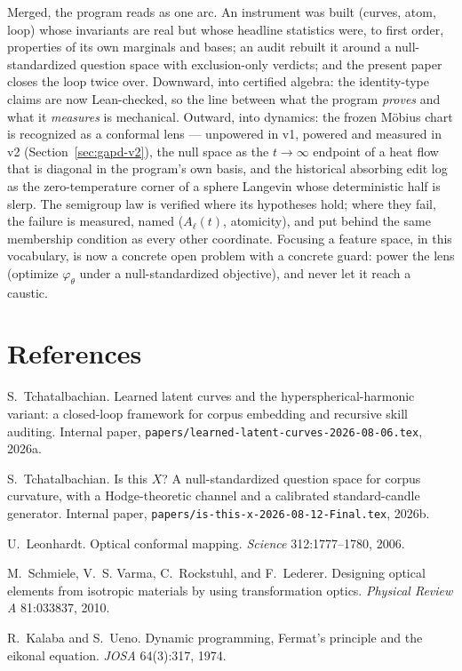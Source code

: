 \documentclass[11pt,a4paper]{article}
\theoremstyle{plain}
\theoremstyle{remark}
\begin{document}
Merged, the program reads as one arc. An instrument was built (curves, atom, loop) whose invariants are real but whose headline statistics were, to first order, properties of its own marginals and bases; an audit rebuilt it around a null-standardized question space with exclusion-only verdicts; and the present paper closes the loop twice over. Downward, into certified algebra: the identity-type claims are now Lean-checked, so the line between what the program \emph{proves} and what it \emph{measures} is mechanical. Outward, into dynamics: the frozen M\"obius chart is recognized as a conformal lens --- unpowered in v1, powered and measured in v2 (Section~\ref{sec:gapd-v2}), the null space as the $t\to\infty$ endpoint of a heat flow that is diagonal in the program's own basis, and the historical absorbing edit log as the zero-temperature corner of a sphere Langevin whose deterministic half is slerp. The semigroup law is verified where its hypotheses hold; where they fail, the failure is measured, named ($A_\ell(t)$, atomicity), and put behind the same membership condition as every other coordinate. Focusing a feature space, in this vocabulary, is now a concrete open problem with a concrete guard: power the lens (optimize $\varphi_\theta$ under a null-standardized objective), and never let it reach a caustic.

\section*{References}

\noindent S.~Tchatalbachian. Learned latent curves and the hyperspherical-harmonic variant: a closed-loop framework for corpus embedding and recursive skill auditing. Internal paper, \texttt{papers/learned-latent-curves-2026-08-06.tex}, 2026a.

\medskip\noindent S.~Tchatalbachian. Is this $X$? A null-standardized question space for corpus curvature, with a Hodge-theoretic channel and a calibrated standard-candle generator. Internal paper, \texttt{papers/is-this-x-2026-08-12-Final.tex}, 2026b.

\medskip\noindent U.~Leonhardt. Optical conformal mapping. \emph{Science} 312:1777--1780, 2006.

\medskip\noindent M.~Schmiele, V.~S. Varma, C.~Rockstuhl, and F.~Lederer. Designing optical elements from isotropic materials by using transformation optics. \emph{Physical Review A} 81:033837, 2010.

\medskip\noindent R.~Kalaba and S.~Ueno. Dynamic programming, Fermat's principle and the eikonal equation. \emph{JOSA} 64(3):317, 1974.
\end{document}
